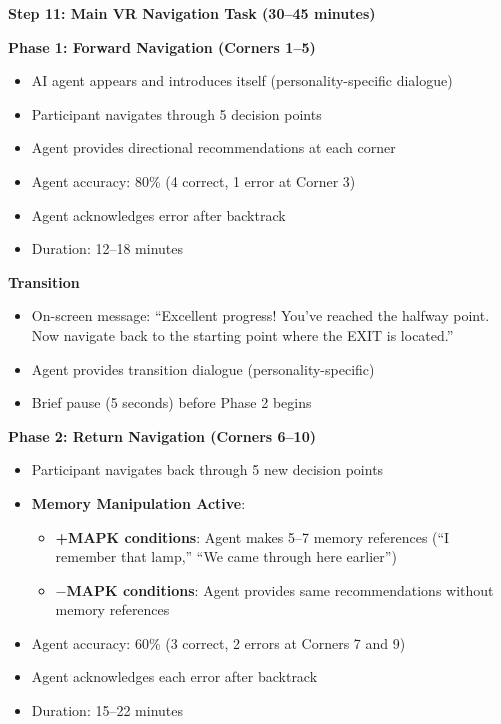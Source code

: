 \documentclass[12pt]{article}
\begin{document}
\textbf{Step 11: Main VR Navigation Task (30--45 minutes)}

\textbf{Phase 1: Forward Navigation (Corners 1--5)}
\begin{itemize}
    \item AI agent appears and introduces itself (personality-specific dialogue)
    \item Participant navigates through 5 decision points
    \item Agent provides directional recommendations at each corner
    \item Agent accuracy: 80\% (4 correct, 1 error at Corner 3)
    \item Agent acknowledges error after backtrack
    \item Duration: 12--18 minutes
\end{itemize}

\textbf{Transition}
\begin{itemize}
    \item On-screen message: ``Excellent progress! You've reached the halfway point. Now navigate back to the starting point where the EXIT is located.''
    \item Agent provides transition dialogue (personality-specific)
    \item Brief pause (5 seconds) before Phase 2 begins
\end{itemize}

\textbf{Phase 2: Return Navigation (Corners 6--10)}
\begin{itemize}
    \item Participant navigates back through 5 new decision points
    \item \textbf{Memory Manipulation Active}:
    \begin{itemize}
        \item \textbf{+MAPK conditions}: Agent makes 5--7 memory references (``I remember that lamp,'' ``We came through here earlier'')
        \item \textbf{$-$MAPK conditions}: Agent provides same recommendations without memory references
    \end{itemize}
    \item Agent accuracy: 60\% (3 correct, 2 errors at Corners 7 and 9)
    \item Agent acknowledges each error after backtrack
    \item Duration: 15--22 minutes
\end{itemize}
\end{document}
